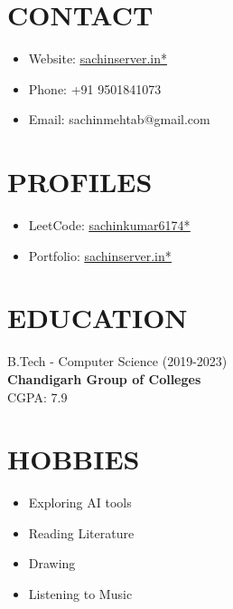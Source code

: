 \documentclass[10pt,a4paper]{moderncv}
\let\oldhref\href
\renewcommand{\href}[2]{\oldhref{#1}{\underline{#2}}}
\begin{document}
\begin{minipage}[t]{0.35\textwidth}
\section{CONTACT}
\begin{itemize}
    \item Website: \href{https://www.sachinserver.in}{sachinserver.in*}
    \item Phone: +91 9501841073
    \item Email: sachinmehtab@gmail.com
\end{itemize}

\section{PROFILES}
\begin{itemize}
    \item LeetCode: \href{https://leetcode.com/u/sachinkumar6174/}{sachinkumar6174*}
    \item Portfolio: \href{https://sachinserver.in/}{sachinserver.in*}
\end{itemize}

\section{EDUCATION}
B.Tech - Computer Science (2019-2023) \\
\textbf{Chandigarh Group of Colleges} \\
\faCalendar\enspace CGPA: 7.9

\section{HOBBIES}
\begin{itemize}
    \item Exploring AI tools
    \item Reading Literature
    \item Drawing
    \item Listening to Music
\end{itemize}

\end{minipage}
\end{document}
